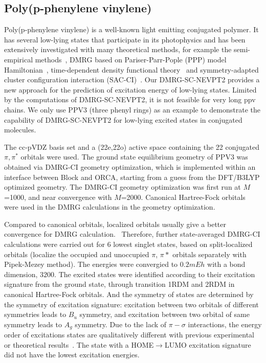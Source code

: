 \subsection{Poly(p-phenylene vinylene)}

Poly(p-phenylene vinylene) is a well-known light emitting conjugated polymer. It has several low-lying states that participate in its photophysics 
and has been extensively investigated with many theoretical methods, for example the semi-empirical methods~\cite{beljonne_theoretical_1995}, DMRG based on Pariser-Parr-Pople (PPP) model Hamiltonian~\cite{lavrentiev_theoretical_1999,shukla_correlated_2002,bursill_symmetry-adapted_2009}, time-dependent density functional theory~\cite{han_time-dependent_2004} and symmetry-adapted cluster configuration interaction (SAC-CI)~\cite{saha_investigation_2007}. 
Our DMRG-SC-NEVPT2 provides a new approach for the prediction of excitation energy of low-lying states.
Limited by the computations of DMRG-SC-NEVPT2, it is not feasible for very long ppv chains. We only use PPV3 (three phenyl rings) as an example to demonstrate the capability of DMRG-SC-NEVPT2 for low-lying excited states in conjugated molecules.

The cc-pVDZ basis set and a (22e,22o) active space containing the 22 conjugated $\pi, \pi^*$ orbitals were used. The ground state equilibrium geometry of PPV3 was obtained via DMRG-CI geometry optimization\cite{hu_excited-state_2015}, which is implemented within an interface between Block and ORCA\cite{neese_orca_2012}, starting from a guess from the DFT/B3LYP optimized geometry. The DMRG-CI geometry optimization was first run at $M$=1000, and near convergence with $M$=2000. Canonical Hartree-Fock orbitals were used 
in the DMRG calculations in the geometry optimization.

Compared to canonical orbitals, localized orbitals usually give a better convergence for DMRG calculation.~\cite{olivares-amaya_ab-initio_2015} Therefore, further state-averaged DMRG-CI calculations were carried out for 6 lowest singlet states, based on split-localized orbitals (localize the occupied and unoccupied $\pi$, $\pi*$ orbitals separately with Pipek-Mezey method\cite{pipek_fast_1989}). The energies were convergied to $0.2mEh$ with a bond dimension, $3200$. The excited states were identified according to their excitation signature from the ground state, through transition 1RDM and 2RDM in canonical Hartree-Fock orbitals. And the symmetry of states are determined by the symmetry of excitation signature: excitation between two orbitals of different symmetries leads to $B_u$ symmetry, and excitation between two orbital of same symmetry leads to $A_g$ symmetry.
Due to the lack of $\pi-\sigma$ interactions, the energy order of excitations states are qualitatively different with previous experimental or theoretical results~\cite{shukla_correlated_2002,bursill_symmetry-adapted_2009}. The state with a HOME$\rightarrow$LUMO excitation signature did not have the lowest excitation energies.

